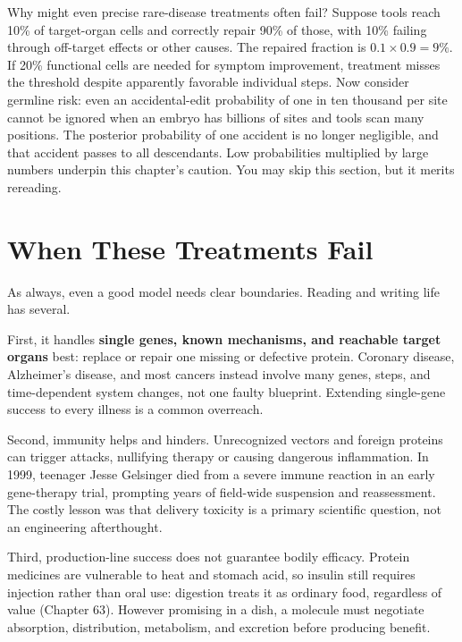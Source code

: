 \begin{tiaozhan}
Why might even precise rare-disease treatments often fail? Suppose tools reach 10\% of target-organ cells and correctly repair 90\% of those, with 10\% failing through off-target effects or other causes. The repaired fraction is $0.1\times0.9=9\%$. If 20\% functional cells are needed for symptom improvement, treatment misses the threshold despite apparently favorable individual steps. Now consider germline risk: even an accidental-edit probability of one in ten thousand per site cannot be ignored when an embryo has billions of sites and tools scan many positions. The posterior probability of one accident is no longer negligible, and that accident passes to all descendants. Low probabilities multiplied by large numbers underpin this chapter's caution. You may skip this section, but it merits rereading.
\end{tiaozhan}

\section{When These Treatments Fail}

As always, even a good model needs clear boundaries. Reading and writing life has several.

First, it handles \textbf{single genes, known mechanisms, and reachable target organs} best: replace or repair one missing or defective protein. Coronary disease, Alzheimer's disease, and most cancers instead involve many genes, steps, and time-dependent system changes, not one faulty blueprint. Extending single-gene success to every illness is a common overreach.

Second, immunity helps and hinders. Unrecognized vectors and foreign proteins can trigger attacks, nullifying therapy or causing dangerous inflammation. In 1999, teenager Jesse Gelsinger died from a severe immune reaction in an early gene-therapy trial, prompting years of field-wide suspension and reassessment. The costly lesson was that delivery toxicity is a primary scientific question, not an engineering afterthought.

Third, production-line success does not guarantee bodily efficacy. Protein medicines are vulnerable to heat and stomach acid, so insulin still requires injection rather than oral use: digestion treats it as ordinary food, regardless of value (Chapter 63). However promising in a dish, a molecule must negotiate absorption, distribution, metabolism, and excretion before producing benefit.

